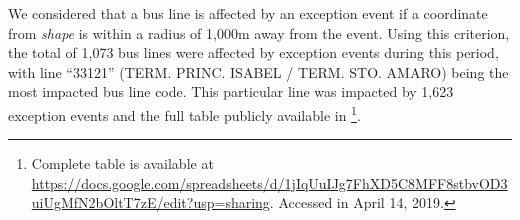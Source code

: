 \documentclass[runningheads]{llncs}
\begin{document}
We considered that a bus line is affected by an exception event if a coordinate from \textit{shape} is within a radius of 1,000m away from the event. Using this criterion, the total of 1,073 bus lines were affected by exception events during this period, with line ``33121'' (TERM. PRINC. ISABEL / TERM. STO. AMARO) being the most impacted bus line code. This particular line was impacted by 1,623 exception events and the full table publicly available in \footnote{Complete table is available at \url{https://docs.google.com/spreadsheets/d/1jIqUuIJg7FhXD5C8MFF8stbvOD3uiUgMfN2bOltT7zE/edit?usp=sharing}. Accessed in April 14, 2019.}.

\end{document}
